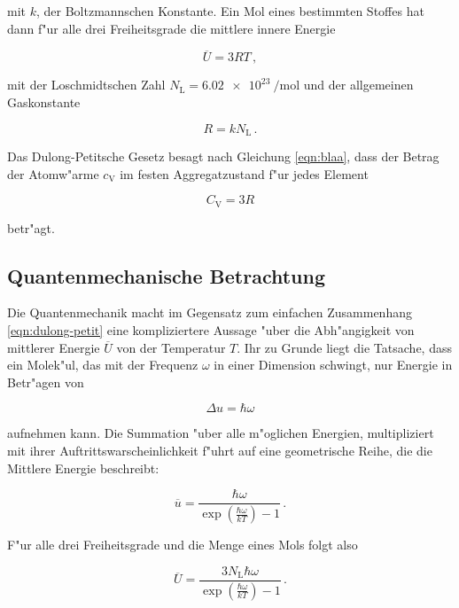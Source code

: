 		mit $k$, der Boltzmannschen Konstante. Ein Mol eines bestimmten Stoffes hat dann f"ur alle drei Freiheitsgrade die mittlere innere Energie

		\begin{equation*}
			\overline{U} = 3RT \,,
		\end{equation*}

		mit der Loschmidtschen Zahl $N_\mathrm{L} = \SI{6.02e23}{\per \mol}$ und der allgemeinen Gaskonstante

		\begin{equation*}
			R = kN_\mathrm{L} \,.
		\end{equation*}

		Das Dulong-Petitsche Gesetz besagt nach Gleichung \eqref{eqn:blaa}, dass der Betrag der Atomw"arme $c_\mathrm{V}$ im festen Aggregatzustand f"ur jedes Element

		\begin{equation}
			C_\mathrm{V} = 3R \label{eqn:dulong-petit}
		\end{equation}

		betr"agt.

	\subsection{Quantenmechanische Betrachtung}
	\label{subsec:quantenmechanik}
		Die Quantenmechanik macht im Gegensatz zum einfachen Zusammenhang \eqref{eqn:dulong-petit} eine kompliziertere Aussage "uber die Abh"angigkeit von mittlerer Energie $\overline{U}$ von der Temperatur $T$.
		Ihr zu Grunde liegt die Tatsache, dass ein Molek"ul, das mit der Frequenz $\omega$ in einer Dimension schwingt, nur Energie in Betr"agen von

		\begin{equation*}
			\Delta u = \hbar \omega
		\end{equation*}

		aufnehmen kann. Die Summation "uber alle m"oglichen Energien, multipliziert mit ihrer Auftrittswarscheinlichkeit f"uhrt auf eine geometrische Reihe, die die Mittlere Energie beschreibt:

		\begin{equation*}
			\overline{u} = \frac{\hbar \omega}{\exp{\left(\frac{\hbar \omega}{k T}\right)} - 1} \,.
		\end{equation*}

		F"ur alle drei Freiheitsgrade und die Menge eines Mols folgt also

		\begin{equation}
			\label{eqn:qm} \overline{U} = \frac{3 N_\mathrm{L} \hbar \omega}{\exp{\left(\frac{\hbar \omega}{k T}\right)} - 1} \,.
		\end{equation}

